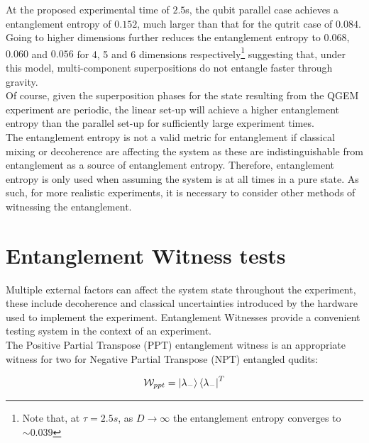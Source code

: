 \documentclass[%
 12pt,
 superscriptaddress,
 amsmath,
 amssymb,
 onecolumn,
 longbibliography
]{revtex4-2}
\begin{document}
\indent At the proposed experimental time of $2.5$s, the qubit parallel case achieves a entanglement entropy of $0.152$, much larger than that for the qutrit case of $0.084$. Going to higher dimensions further reduces the entanglement entropy to $0.068$, $0.060$ and $0.056$ for 4, 5 and 6 dimensions respectively\footnote{Note that, at $\tau=2.5s$, as $D \to \infty$ the entanglement entropy converges to $\sim0.039$} suggesting that, under this model, multi-component superpositions do not entangle faster through gravity. \\
\indent Of course, given the superposition phases for the state resulting from the QGEM experiment are periodic, the linear set-up will achieve a higher entanglement entropy than the parallel set-up for sufficiently large experiment times. \\
\indent The entanglement entropy is not a valid metric for entanglement if classical mixing or decoherence are affecting the system as these are indistinguishable from entanglement as a source of entanglement entropy. Therefore, entanglement entropy is only used when assuming the system is at all times in a pure state. As such, for more realistic experiments, it is necessary to consider other methods of witnessing the entanglement.

\section{Entanglement Witness tests\label{sec:EW}}

\indent Multiple external factors can affect the system state throughout the experiment, these include decoherence and classical uncertainties introduced by the hardware used to implement the experiment.  Entanglement Witnesses provide a convenient testing system in the context of an experiment. \\
\indent The Positive Partial Transpose (PPT) entanglement witness is an appropriate witness for two for Negative Partial Transpose (NPT) entangled qudits:

		\begin{equation}
			\mathcal{W}_{ppt}=\Ket{\lambda_-}\Bra{\lambda_-}^T
		\end{equation}
\end{document}
